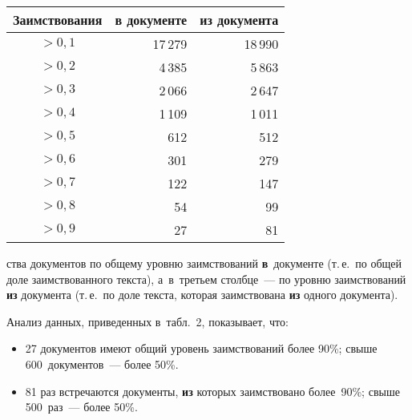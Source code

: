 \begin{multicols}{2}
\begin{center}
{\small \begin{tabular}{|c|r|r|}
\hline
\multicolumn{1}{|c|}{Заимствования}&  \textbf{в} документе &  \textbf{из} документа\\
\hline
$>0{,}1$ & 17\,279\hspace*{5mm}& 18\,990\hspace*{5mm}\\
$>0{,}2$& 4\,385\hspace*{5mm}& 5\,863\hspace*{5mm}\\
$>0{,}3$& 2\,066\hspace*{5mm}& 2\,647\hspace*{5mm}\\
$>0{,}4$& 1\,109\hspace*{5mm}& 1\,011\hspace*{5mm}\\
$>0{,}5$& 612\hspace*{5mm} & 512\hspace*{5mm}\\
$>0{,}6$& 301\hspace*{5mm}& 279\hspace*{5mm}\\
$>0{,}7$& 122\hspace*{5mm}& 147\hspace*{5mm}\\
$>0{,}8$& 54\hspace*{5mm}& 99\hspace*{5mm}\\
$>0{,}9$& 27\hspace*{5mm}& 81\hspace*{5mm}\\
\hline
\end{tabular}
}
\vspace*{3pt}
\end{center}

  
  
  \noindent
  ства 
документов по общему уровню заимствований \textbf{в}~документе (т.\,е.\ по 
общей доле заимствованного текста), а~в~третьем столбце~--- по уровню 
заимствований \textbf{из} документа (т.\,е.\ по доле текста, которая 
заимствована \textbf{из} одного документа).
   

  
  Анализ данных, приведенных в~табл.~2, показывает, что:
  \begin{itemize}
  \item 27 документов имеют общий уровень заимствований более 90\%; 
свыше 600~документов~--- более 50\%. 
\item 81 раз встречаются документы, \textbf{из} которых заимствовано 
более~90\%; свыше 500~раз~--- более 50\%.
\end{itemize} 


\end{multicols}
